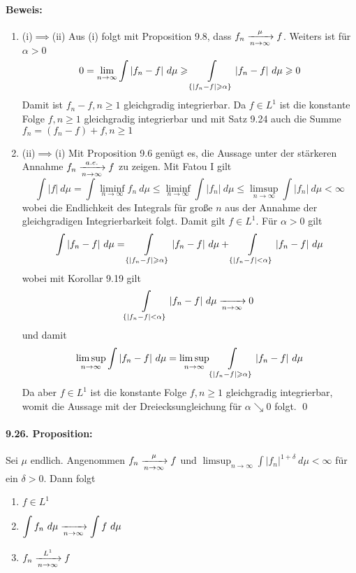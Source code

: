 \paragraph{Beweis:}
\begin{enumerate}[label=\Roman*.]
    \item (i)$\implies$(ii)\newline
    Aus (i) folgt mit Proposition 9.8, dass $f_n\nto{\mu}{n\to\infty}f$. Weiters ist f\"ur $\alpha>0$
    $$0=\lim_{n\to\infty}\int|f_n-f|\ d\mu\geq\int\displaylimits_{\{|f_n-f|\geq\alpha\}}|f_n-f|\ d\mu\geq0$$
    Damit ist $f_n-f,n\geq1$ gleichgradig integrierbar. Da $f\in L^1$ ist die konstante Folge $f,n\geq1$ gleichgradig integrierbar und mit Satz 9.24 auch die Summe $f_n=(f_n-f)+f,n\geq1$
    \item (ii)$\implies$(i)\newline
     Mit Proposition 9.6 gen\"ugt es, die Aussage unter der st\"arkeren Annahme $f_n\nto{a.e.}{n\to\infty}f$ zu zeigen. Mit Fatou I gilt
     $$\int|f|\ d\mu=\int\liminf_{n\to\infty}f_n\ d\mu\leq\liminf_{n\to\infty}\int|f_n|\ d\mu\leq\limsup_{n\to\infty}\int|f_n|\ d\mu<\infty$$
     wobei die Endlichkeit des Integrals f\"ur große $n$ aus der Annahme der gleichgradigen Integrierbarkeit folgt. Damit gilt $f\in L^1$.
     F\"ur $\alpha>0$ gilt
     $$\int|f_n-f|\ d\mu=\int\displaylimits_{\{|f_n-f|\geq\alpha\}}|f_n-f|\ d\mu+\int\displaylimits_{\{|f_n-f|<\alpha\}}|f_n-f|\ d\mu$$
     wobei mit Korollar 9.19 gilt
     $$\int\displaylimits_{\{|f_n-f|<\alpha\}}|f_n-f|\ d\mu\nto{}{n\to\infty}0$$
     und damit
     $$\limsup_{n\to\infty}\int|f_n-f|\ d\mu=\limsup_{n\to\infty}\int\displaylimits_{\{|f_n-f|\geq\alpha\}}|f_n-f|\ d\mu$$
     Da aber $f\in L^1$ ist die konstante Folge $f,n\geq1$ gleichgradig integrierbar, womit die Aussage mit der Dreiecksungleichung f\"ur $\alpha\searrow0$ folgt. \qed
\end{enumerate}

\paragraph{9.26. Proposition:}Sei $\mu$ endlich. Angenommen $f_n\nto{\mu}{n\to\infty}f$ und $\limsup_{n\to\infty}\int|f_n|^{1+\delta}\ d\mu<\infty$ f\"ur ein $\delta>0$. Dann folgt
\begin{enumerate}[label=(\roman*)]
    \item $f\in L^1$
    \item $\displaystyle\int f_n\ d\mu\nto{}{n\to\infty}\int f\ d\mu$
    \item $f_n\nto{L^1}{n\to\infty}f$
\end{enumerate}

